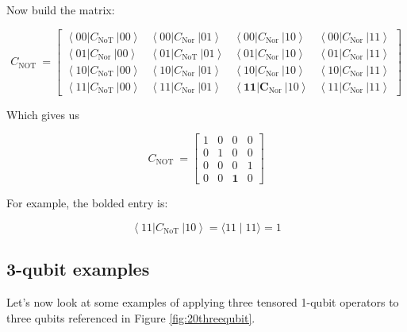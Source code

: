 \documentclass[main.tex]{subfiles}
\begin{document}
    Now build the matrix:
    
    $$
    C_{\text {NOT }}=\left[\begin{array}{llll}
    \left\langle 00\left|C_{\text {NoT }}\right| 00\right\rangle & \left\langle 00\left|C_{\text {Nor }}\right| 01\right\rangle & \left\langle 00\left|C_{\text {Nor }}\right| 10\right\rangle & \left\langle 00\left|C_{\text {Nor }}\right| 11\right\rangle \\
    \left\langle 01\left|C_{\text {Nor }}\right| 00\right\rangle & \left\langle 01\left|C_{\text {NoT }}\right| 01\right\rangle & \left\langle 01\left|C_{\text {Nor }}\right| 10\right\rangle & \left\langle 01\left|C_{\text {Nor }}\right| 11\right\rangle \\
    \left\langle 10\left|C_{\text {NoT }}\right| 00\right\rangle & \left\langle 10\left|C_{\text {Nor }}\right| 01\right\rangle & \left\langle 10\left|C_{\text {Nor }}\right| 10\right\rangle & \left\langle 10\left|C_{\text {Nor }}\right| 11\right\rangle \\
    \left\langle 11\left|C_{\text {NoT }}\right| 00\right\rangle & \left\langle 11\left|C_{\text {Nor }}\right| 01\right\rangle & \left\langle\mathbf{1 1}\left|\mathbf{C}_{\text {Nor }}\right| 10\right\rangle & \left\langle 11\left|C_{\text {Nor }}\right| 11\right\rangle
    \end{array}\right]
    $$
    
    Which gives us
    
    $$
    C_{\text {NOT }}=\left[\begin{array}{llll}
    1 & 0 & 0 & 0 \\
    0 & 1 & 0 & 0 \\
    0 & 0 & 0 & 1 \\
    0 & 0 & \mathbf{1} & 0
    \end{array}\right]
    $$
    
    For example, the bolded entry is:
    
    $$
    \left\langle 11\left|C_{\text {NoT }}\right| 10\right\rangle=\langle 11 \mid 11\rangle=1
    $$

\subsection{3-qubit examples}

    Let's now look at some examples of applying three tensored 1-qubit operators to three qubits referenced in Figure \ref{fig:20threequbit}.
    
\end{document}
